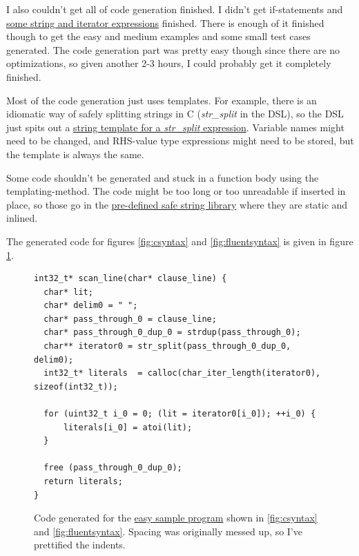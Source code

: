 \documentclass[letterpaper]{article}
\begin{document}
I also couldn't get all of code generation finished. I didn't get
if-statements and \href{https://github.com/Flandini/cse501project20au/blob/master/scala-dsl/dsl/src/main/scala/Codegen.scala#L242}{
some string and iterator expressions} finished. There is enough of it
finished though to get the easy and medium examples and some small
test cases generated. The code generation part was pretty easy though
since there are no optimizations, so given another 2-3 hours, I could
probably get it completely finished.

Most of the code generation just uses templates. For example, there is an
idiomatic way of safely splitting strings in C (\textit{str\_split} in the DSL),
so the DSL just spits out a \href{https://github.com/Flandini/cse501project20au/blob/master/scala-dsl/dsl/src/main/scala/Codegen.scala#L267}{string template for a \textit{str\_split} expression}.
Variable names might need to be changed, and RHS-value type expressions might need to be
stored, but the template is always the same.

Some code shouldn't be generated and stuck in a function body using the templating-method.
The code might be too long or too unreadable if inserted in place, so those go in the
\href{https://github.com/Flandini/cse501project20au/blob/master/scala-dsl/dsl/src/main/scala/lib.h#L7}{pre-defined
  safe string library} where they are static and inlined.


The generated code for figures \ref{fig:csyntax} and \ref{fig:fluentsyntax}
is given in figure \ref{fig:gencode}.

\begin{figure}[h]
  \centering
  \begin{lstlisting}
int32_t* scan_line(char* clause_line) {
  char* lit;
  char* delim0 = " ";
  char* pass_through_0 = clause_line;
  char* pass_through_0_dup_0 = strdup(pass_through_0);
  char** iterator0 = str_split(pass_through_0_dup_0, delim0);
  int32_t* literals  = calloc(char_iter_length(iterator0), sizeof(int32_t));

  for (uint32_t i_0 = 0; (lit = iterator0[i_0]); ++i_0) {
      literals[i_0] = atoi(lit);
  }

  free (pass_through_0_dup_0);
  return literals;
}
  \end{lstlisting}
  \caption{Code generated for the \href{https://github.com/Flandini/cse501project20au/blob/master/samples/easy/single_line_dimacs_scanner.sal}{easy sample program} shown in \ref{fig:csyntax} and
    \ref{fig:fluentsyntax}. Spacing was originally messed up, so I've prettified the
    indents.}
  \label{fig:gencode}
\end{figure}
\end{document}

